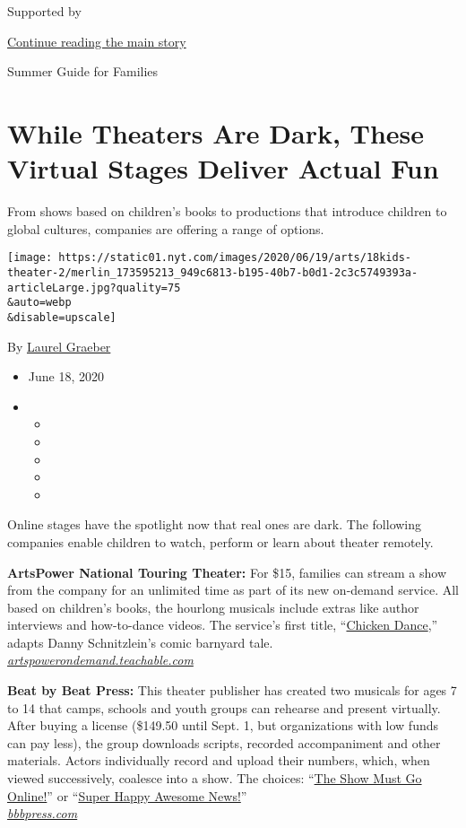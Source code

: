 Supported by

\protect\hyperlink{after-sponsor}{Continue reading the main story}

Summer Guide for Families

\hypertarget{while-theaters-are-dark-these-virtual-stages-deliver-actual-fun}{%
\section{While Theaters Are Dark, These Virtual Stages Deliver Actual
Fun}\label{while-theaters-are-dark-these-virtual-stages-deliver-actual-fun}}

From shows based on children's books to productions that introduce
children to global cultures, companies are offering a range of options.

\texttt{[image: https://static01.nyt.com/images/2020/06/19/arts/18kids-theater-2/merlin\_173595213\_949c6813-b195-40b7-b0d1-2c3c5749393a-articleLarge.jpg?quality=75\\\&auto=webp\\\&disable=upscale]}

By \href{https://www.nytimes.com/by/laurel-graeber}{Laurel Graeber}

\begin{itemize}
\item
  June 18, 2020
\item
  \begin{itemize}
  \item
  \item
  \item
  \item
  \item
  \end{itemize}
\end{itemize}

Online stages have the spotlight now that real ones are dark. The
following companies enable children to watch, perform or learn about
theater remotely.

\textbf{ArtsPower National Touring Theater:} For \$15, families can
stream a show from the company for an unlimited time as part of its new
on-demand service. All based on children's books, the hourlong musicals
include extras like author interviews and how-to-dance videos. The
service's first title,
``\href{https://artspowerondemand.teachable.com/courses}{Chicken
Dance},'' adapts Danny Schnitzlein's comic barnyard tale.\\
\href{https://artspowerondemand.teachable.com/}{\emph{artspowerondemand.teachable.com}}

\textbf{Beat by Beat Press:} This theater publisher has created two
musicals for ages 7 to 14 that camps, schools and youth groups can
rehearse and present virtually. After buying a license (\$149.50 until
Sept. 1, but organizations with low funds can pay less), the group
downloads scripts, recorded accompaniment and other materials. Actors
individually record and upload their numbers, which, when viewed
successively, coalesce into a show. The choices:
``\href{http://www.bbbpress.com/musicals/the-show-must-go-online/}{The
Show Must Go Online!}'' or
``\href{http://www.bbbpress.com/musicals/super-happy-awesome-news/}{Super
Happy Awesome News!}''\\
\href{http://www.bbbpress.com/}{\emph{bbbpress.com}}

